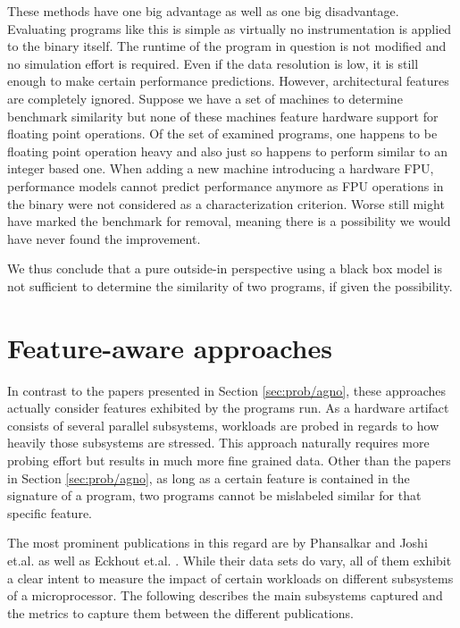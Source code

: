 \documentclass[../bachelor_paper.tex]{subfiles}
\begin{document}
These methods have one big advantage as well as one big disadvantage. Evaluating programs like this is simple as virtually no instrumentation is applied to the binary itself. The runtime of the program in question is not modified and no simulation effort is required. Even if the data resolution is low, it is still enough to make certain performance predictions. However, architectural features are completely ignored. Suppose we have a set of machines to determine benchmark similarity but none of these machines feature hardware support for floating point operations. Of the set of examined programs, one happens to be floating point operation heavy and also just so happens to perform similar to an integer based one. When adding a new machine introducing a hardware \ac{FPU}, performance models cannot predict performance anymore as \ac{FPU} operations in the binary were not considered as a characterization criterion. Worse still \cite{vandierendonckManyBenchmarksStress} might have marked the benchmark for removal, meaning there is a possibility we would have never found the improvement.

We thus conclude that a pure outside-in perspective using a black box model is not sufficient to determine the similarity of two programs, if given the possibility.

\section{Feature-aware approaches}
	\label{sec:prob/aware}
In contrast to the papers presented in Section \ref{sec:prob/agno}, these approaches actually consider features exhibited by the programs run. As a hardware artifact consists of several parallel subsystems, workloads are probed in regards to how heavily those subsystems are stressed. This approach naturally requires more probing effort but results in much more fine grained data. Other than the papers in Section \ref{sec:prob/agno}, as long as a certain feature is contained in the signature of a program, two programs cannot be mislabeled similar for that specific feature.

The most prominent publications in this regard are by Phansalkar and Joshi et.al. \cite{phansalkarMeasuringProgramSimilarity2005,joshiMeasuringBenchmarkSimilarity2006} as well as Eckhout et.al. \cite{eeckhoutQuantifyingImpactInput}. While their data sets do vary, all of them exhibit a clear intent to measure the impact of certain workloads on different subsystems of a microprocessor. The following describes the main subsystems captured and the metrics to capture them between the different publications.
\end{document}
